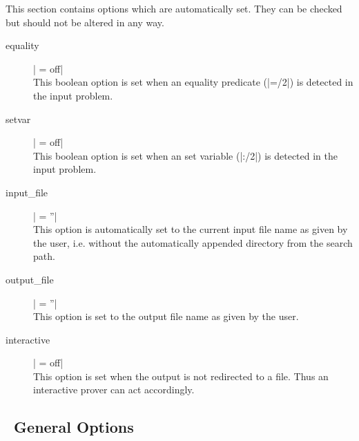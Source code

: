 This section contains options which are automatically set. They can be checked
but should not be altered in any way.

\begin{description}
  \item [equality] | = off|\\
  This boolean option is set when an equality predicate (|=/2|) is detected
  in the input problem.

  \item [setvar] | = off|\\
  This boolean option is set when an set variable (|:/2|) is detected in the
  input problem.

  \item [input\_file] | = ''|\\
  This option is automatically set to the current input file name as given
  by the user, i.e. without the automatically appended directory from the
  search path.

  \item [output\_file] | = ''|\\
  This option is set to the output file name as given by the user.

  \item [interactive] | = off|\\
  This option is set when the output is not redirected to a file. Thus an
  interactive prover can act accordingly.

\end{description}



\subsection{\ProCom\ General Options}

